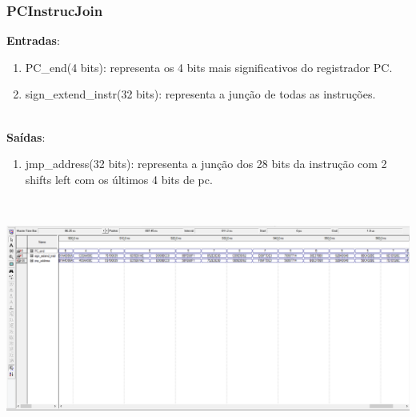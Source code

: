\documentclass{article}
\begin{document}
    \subsubsection{PCInstrucJoin}
    \textbf{Entradas}:
    \begin{enumerate}
        \item PC\_end(4 bits): representa os 4 bits mais significativos do registrador PC.
        \item sign\_extend\_instr(32 bits): representa a junção de todas as instruções.\\
    \end{enumerate}
    \\
    \textbf{Saídas}:
    \begin{enumerate}
        \item jmp\_address(32 bits): representa a junção dos 28 bits da instrução com 2 shifts left com os últimos 4 bits de pc.\\ 
    \end{enumerate}\\
    \begin{center}
        \includegraphics[scale=0.4]{PCInstrucJoin.PNG}
    \end{center}
    \\
    
    \newpage
\end{document}
